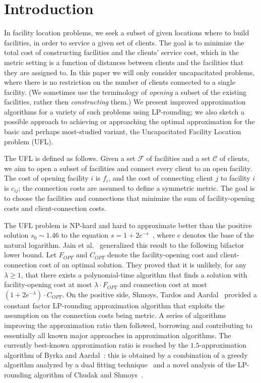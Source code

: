 \documentclass[11pt]{article}
\begin{document}
\section{Introduction} 
In facility location problems, we seek a subset of given locations
where to build facilities, in order to service a given set of clients.
The goal is to minimize the total cost of constructing facilities
and the clients' service cost, which in the metric setting is a function of distances
between clients and the facilities that they are assigned to.
In this paper we will only consider uncapacitated problems,
where there is no restriction on the number of clients connected
to a single facility. (We sometimes use the terminology of 
\emph{opening} a subset of the existing facilities, rather then 
\emph{constructing} them.) We present improved approximation
algorithms for a variety of such problems using LP-rounding; we also
sketch a possible approach to achieving or approaching the optimal
approximation for the basic and perhaps most-studied variant, the
Uncapacitated Facility Location problem (UFL). 

The UFL is defined as follows.
Given a set $\mathcal{F}$ of facilities and a set $\mathcal{C}$ 
of clients, we aim to open a subset of facilities and connect every
client to an open facility. The cost of opening facility $i$ is $f_i$, 
and the cost of connecting client $j$ to facility $i$ is $c_{ij}$;
the connection costs are assumed to define a symmetric metric.
The goal is to choose the facilities and connections
 that minimize the sum of facility-opening costs and client-connection costs. 

The UFL problem is NP-hard and hard to approximate better than the
positive solution $s_0 \sim 1.46$ to the equation $s = 1 + 2 e^{-s}$~\cite{DBLP:journals/jal/GuhaK99}, where $e$ denotes the base of the natural logarithm. 
Jain et al.~\cite{DBLP:journals/jacm/JainMMSV03} generalized this result to the following bifactor lower bound.
Let $F_{OPT}$ and $C_{OPT}$ denote the facility-opening cost and client-connection cost of an optimal solution. 
They proved that it is unlikely, for any $\lambda \geq 1$, that there exists 
a polynomial-time algorithm that finds a solution with facility-opening cost at most
$\lambda \cdot F_{OPT}$ { and} connection cost at most $(1 + 2e^{-\lambda})\cdot C_{OPT}$. 
On the positive side, Shmoys, Tardos and Aardal~\cite{DBLP:conf/stoc/ShmoysTA97} provided
a constant factor LP-rounding approximation algorithm that exploits
the assumption on the connection costs being metric.
A series of algorithms improving the approximation ratio then
followed, borrowing and contributing to essentially all known major
approaches in approximation algorithms.  
The currently best-known approximation ratio is reached by the 
$1.5$-approximation algorithm of
Byrka and Aardal~\cite{byrka:2212}: this is obtained by a combination of a greedy algorithm
analyzed by a dual fitting technique~\cite{DBLP:journals/siamcomp/MahdianYZ06} and a novel analysis of the 
LP-rounding algorithm of Chudak and Shmoys~\cite{DBLP:journals/siamcomp/ChudakS03}.
\end{document}
